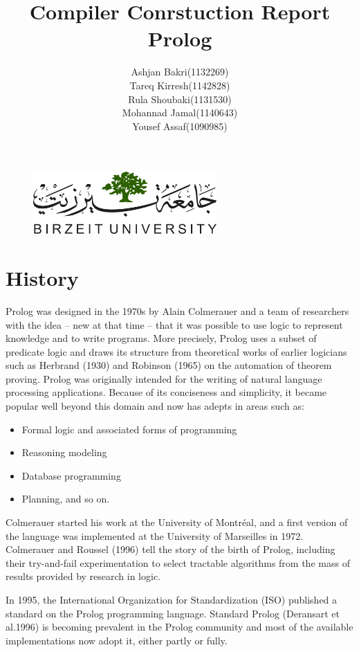 \documentclass[14pt]{article}
\title{Compiler Conrstuction Report\\Prolog}
\author{Ashjan Bakri(1132269)\\Tareq Kirresh(1142828)\\Rula
Shoubaki(1131530)\\Mohannad Jamal(1140643)\\Yousef Assaf(1090985)}
\begin{document}
\begin{figure}
\centering
  \includegraphics[width=7cm]{LOGO.png}
\end{figure}
\maketitle
\newpage
\tableofcontents 
\newpage 
\section{History}

Prolog was designed in the 1970s by Alain Colmerauer and a team of 
researchers with the idea – new at that time – that it was possible to 
use logic to represent knowledge and to write programs. More precisely,
Prolog uses a subset of predicate logic and draws its structure from 
theoretical works of earlier logicians such as Herbrand (1930) and 
Robinson (1965) on the automation of theorem proving. Prolog was 
originally intended for the writing of natural language processing 
applications. Because of its conciseness and simplicity, it became 
popular well beyond this domain and now has adepts in areas such as:
\begin{itemize}
\item Formal logic and associated forms of programming
\item Reasoning modeling
\item Database programming
\item Planning, and so on.
\end{itemize}
Colmerauer started his work at the University of Montréal, and a first 
version of the language was implemented at the University of Marseilles 
in 1972. Colmerauer and Roussel (1996) tell the story of the birth of 
Prolog, including their try-and-fail experimentation to select tractable
algorithms from the mass of results provided by research in logic.


In 1995, the International Organization for Standardization (ISO) 
published a standard on the Prolog programming language. Standard Prolog
(Deransart et al.1996) is becoming prevalent in the Prolog community and
most of the available implementations now adopt it, either partly or 
fully.
 
\end{document}
